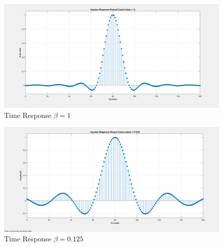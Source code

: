 \documentclass{article}
\begin{document}
\begin{figure}[h]
  \begin{center}
      \includegraphics[width=\linewidth]{img/impulse_response_beta_1.png}
      \caption{Time Response $\beta = 1$}
  \end{center}
\end{figure}

\begin{figure}[h]
  \begin{center}
      \includegraphics[width=\linewidth]{img/impulse_response_beta_125.png}
      \caption{Time Response $\beta = 0.125$}
  \end{center}
\end{figure}
\end{document}
